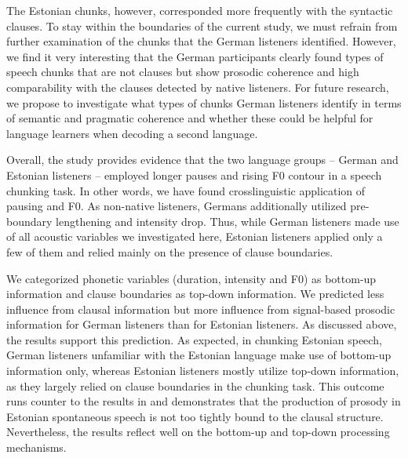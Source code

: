 \documentclass[output=paper]{langscibook}
\begin{document}
    The Estonian chunks, however, corresponded more frequently with the syntactic clauses. To stay within the boundaries of the current study, we must refrain from further examination of the chunks that the German listeners identified. However, we find it very interesting that the German participants clearly found types of speech chunks that are not clauses but show prosodic coherence and high comparability with the clauses detected by native listeners. For future research, we propose to investigate what types of chunks German listeners identify in terms of semantic and pragmatic coherence and whether these could be helpful for language learners when decoding a second language.

    Overall, the study provides evidence that the two language groups  --  German and Estonian listeners  --  employed longer pauses and rising F0 contour in a speech chunking task. In other words, we have found crosslinguistic application of pausing and F0. As non-native listeners, Germans additionally utilized pre-boundary lengthening and intensity drop. Thus, while German listeners made use of all acoustic variables we investigated here, Estonian listeners applied only a few of them and relied mainly on the presence of clause boundaries.
	
	\begin{sloppypar}
    We categorized phonetic variables (duration, intensity and F0) as bottom-up information and clause boundaries as top-down information. We predicted less influence from clausal information but more influence from signal-based prosodic information for German listeners than for Estonian listeners. As discussed above, the results support this prediction. As expected, in chunking Estonian speech, German listeners unfamiliar with the Estonian language make use of bottom-up information only, whereas Estonian listeners mostly utilize top-down information, as they largely relied on clause boundaries in the chunking task. This outcome runs counter to the results in \citet[][]{riesbergEtAl2020} and demonstrates that the production of prosody in Estonian spontaneous speech is not too tightly bound to the clausal structure. Nevertheless, the results reflect well on the bottom-up and top-down processing mechanisms. %
    \end{sloppypar}
    
\end{document}
